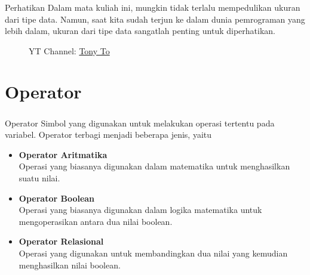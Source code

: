 \documentclass[aspectratio=169]{beamer}
\theoremstyle{definition}
\begin{document}
    \begin{frame}
        \frametitle{\insertsection}
        \begin{alertblock}{Perhatikan}
            Dalam mata kuliah ini, mungkin tidak terlalu mempedulikan ukuran dari tipe data. Namun, saat kita sudah terjun ke dalam dunia pemrograman yang lebih dalam, ukuran dari tipe data sangatlah penting untuk diperhatikan.
        \end{alertblock}
        \begin{figure}[h!]
            \centering
            \caption*{YT Channel: \href{https://www.youtube.com/watch?v=wprBfd1aWG4}{\color{red} Tony To}}
        \end{figure}
    \end{frame}

    \section{Operator}
    \begin{frame}
        \frametitle{\insertsection}
        \begin{block}{Operator}
            Simbol yang digunakan untuk melakukan operasi tertentu pada variabel. Operator terbagi menjadi beberapa jenis, yaitu
            \begin{itemize}[label=$\circ$]
                \item \textbf{Operator Aritmatika}\\
                Operasi yang biasanya digunakan dalam matematika untuk menghasilkan suatu nilai.
                \item \textbf{Operator Boolean}\\
                Operasi yang biasanya digunakan dalam logika matematika untuk mengoperasikan antara dua nilai boolean.
                \item \textbf{Operator Relasional}\\
                Operasi yang digunakan untuk membandingkan dua nilai yang kemudian menghasilkan nilai boolean.
            \end{itemize}
        \end{block}
    \end{frame}
\end{document}
